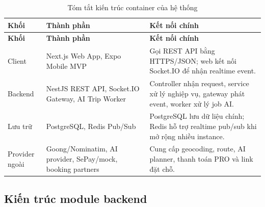 \documentclass[a4paper]{report}
\begin{document}
\begin{longtable}{|P{3.8cm}|P{5.4cm}|P{6.2cm}|}
\caption{Tóm tắt kiến trúc container của hệ thống}\\
\hline
\textbf{Khối} & \textbf{Thành phần} & \textbf{Kết nối chính}\\
\hline
\endfirsthead
\hline
\textbf{Khối} & \textbf{Thành phần} & \textbf{Kết nối chính}\\
\hline
\endhead
Client & Next.js Web App, Expo Mobile MVP & Gọi REST API bằng HTTPS/JSON; web kết nối Socket.IO để nhận realtime event.\\
\hline
Backend & NestJS REST API, Socket.IO Gateway, AI Trip Worker & Controller nhận request, service xử lý nghiệp vụ, gateway phát event, worker xử lý job AI.\\
\hline
Lưu trữ & PostgreSQL, Redis Pub/Sub & PostgreSQL lưu dữ liệu chính; Redis hỗ trợ realtime pub/sub khi mở rộng nhiều instance.\\
\hline
Provider ngoài & Goong/Nominatim, AI provider, SePay/mock, booking partners & Cung cấp geocoding, route, AI planner, thanh toán PRO và link đặt chỗ.\\
\hline
\end{longtable}

\subsection{Kiến trúc module backend}
\end{document}
